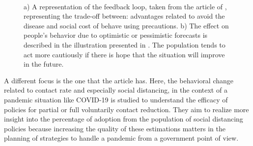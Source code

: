 \begin{figure}[h]
	\centering
	 \quad
	 \\
	\caption[Game theory]{a) A representation of the feedback loop, taken from the article of \cite{Wang_2015}, representing the trade-off between: advantages related to avoid the disease and social cost of behave using precautions.  b) The effect on people's behavior due to optimistic or pessimistic forecasts is described in the illustration presented in \cite{Auld_2003}. The population tends to act more cautiously if there is hope that the situation will improve in the future.}
	\label{fig:abm_game}
\end{figure}

A different focus is the one that the article  \cite{Gosak_2021_game} has. Here, the behavioral change related to contact rate and especially social distancing, in the context of a pandemic situation like COVID-19  is studied to understand the efficacy of policies for partial or full voluntarily contact reduction. They aim to realize more insight into the percentage of adoption from the population of social distancing policies because increasing the quality of these estimations matters in the planning of strategies to handle a pandemic from a government point of view.

